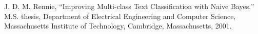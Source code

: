 \documentclass[conference]{IEEEtran}
\begin{document}


%
%
%
\begin{thebibliography}{1}

J. D. M. Rennie, ``Improving Multi-class Text Classification with Naive Bayes,'' M.S. thesis, Department of Electrical Engineering and Computer Science, Massachusetts Institute of Technology, Cambridge, Massachusetts, 2001. 

\end{thebibliography}




\end{document}
